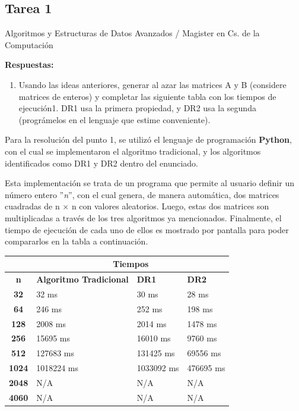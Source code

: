 \documentclass[12pt]{report}
\begin{document}
  \begin{center}
    \section*{Tarea 1}
    
    Algoritmos y Estructuras de Datos Avanzados / Magister en Cs. de la Computación
  \end{center}
  
  \textbf{Respuestas:}
  
  \begin{enumerate}
    \item Usando las ideas anteriores, generar al azar las
    matrices A y B (considere matrices de enteros) y
    completar las siguiente tabla con los tiempos de
    ejecución1. DR1 usa la primera propiedad, y DR2
    usa la segunda (prográmelos en el lenguaje que
    estime conveniente).
  \end{enumerate}
  
  Para la resolución del punto 1, se utilizó el lenguaje de programación \textbf{Python}, con el cual se implementaron el algoritmo tradicional, y los algoritmos identificados como DR1 y DR2 dentro del enunciado.
  
  Esta implementación se trata de un programa que permite al usuario definir un número entero ''\textit{n}'', con el cual genera, de manera automática, dos matrices cuadradas de n × n con valores aleatorios. Luego, estas dos matrices son multiplicadas a través de los tres algoritmos ya mencionados. Finalmente, el tiempo de ejecución de cada uno de ellos es mostrado por pantalla para poder compararlos en la tabla a continuación.
  
  \begin{center}
    \begin{tabular}{ | c | p{5.5cm} | p{3.5cm} | p{3.5cm} |}
      \hline
      {} & \multicolumn{3}{|c|}{\textbf{Tiempos}} \\
      \hline
      \textbf{n} & {\textbf{Algoritmo Tradicional}} & {\textbf{DR1}} & {\textbf{DR2}}\\ \hline
      {\textbf{32}} & 32 ms & 30 ms & 28 ms \\ \hline
      {\textbf{64}} & 246 ms & 252 ms & 198 ms \\ \hline
      {\textbf{128}} & 2008 ms & 2014 ms & 1478 ms \\ \hline
      {\textbf{256}} & 15695 ms & 16010 ms & 9760 ms \\ \hline
      {\textbf{512}} & 127683 ms & 131425 ms & 69556 ms \\ \hline
      {\textbf{1024}} & 1018224 ms & 1033092 ms & 476695 ms \\ \hline
      {\textbf{2048}} & N/A & N/A & N/A \\ \hline
      {\textbf{4060}} & N/A & N/A & N/A \\ \hline
    \end{tabular}
  \end{center}
\end{document}
